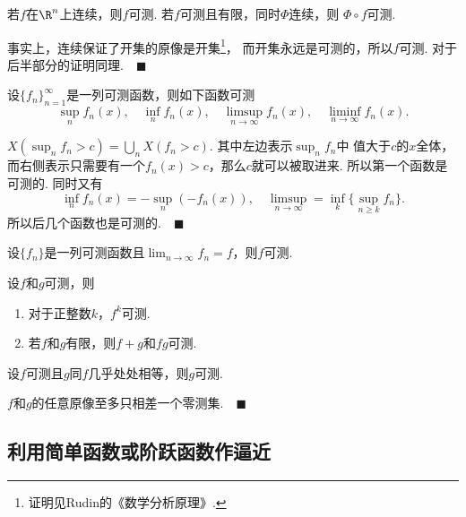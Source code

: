   \begin{thm}
    若$f$在$\R^n$上连续，则$f$可测. 若$f$可测且有限，同时$\Phi$连续，则
    $\Phi\circ f$可测.
  \end{thm}
  \proof
    事实上，连续保证了开集的原像是开集\footnote{证明见Rudin的《数学分析原理》.}，
    而开集永远是可测的，所以$f$可测. 对于后半部分的证明同理.$\quad\blacksquare$

  \begin{thm}
    设$\{f_n\}_{n=1}^\infty$是一列可测函数，则如下函数可测
    \[
      \sup_n f_n(x),\quad \inf_nf_n(x),\quad \limsup_{n\to\infty}f_n(x),
      \quad \liminf_{n\to\infty}f_n(x).
    \]
  \end{thm}
  \proof
    $X(\sup_n f_n>c) = \bigcup_n X(f_n>c)$. 其中左边表示$\sup_n f_n$中
    值大于$c$的$x$全体，而右侧表示只需要有一个$f_n(x)>c$，那么$c$就可以被取进来.
    所以第一个函数是可测的. 同时又有
    \[
      \inf_nf_n(x) = -\sup_n(-f_n(x)), \quad
      \limsup_{n\to\infty} = \inf_k\{\sup_{n\ge k}f_n\}.
    \]
    所以后几个函数也是可测的.$\quad\blacksquare$

  \begin{cor}
    设$\{f_n\}$是一列可测函数且$\lim_{n\to\infty}f_n = f$，则$f$可测.
  \end{cor}

  \begin{thm}
    设$f$和$g$可测，则
    \begin{enumerate}
      \item 对于正整数$k$，$f^k$可测.
      \item 若$f$和$g$有限，则$f+g$和$fg$可测.
    \end{enumerate}
  \end{thm}


  \begin{thm}
    设$f$可测且$g$同$f$几乎处处相等，则$g$可测.
  \end{thm}
  \remark
    $f$和$g$的任意原像至多只相差一个零测集.$\quad\blacksquare$


\subsection{利用简单函数或阶跃函数作逼近}

